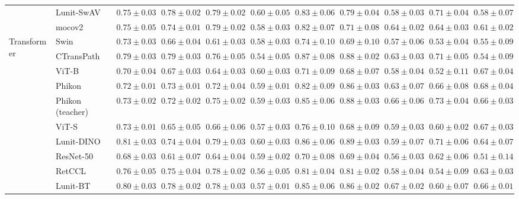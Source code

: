 \begin{tabular}{ll|cccc|c|cccc}
 & Lunit-SwAV & $0.75 \pm 0.03$ & $\mathbf{0.78 \pm 0.02}$ & $\mathbf{0.79 \pm 0.02}$ & $0.60 \pm 0.05$ & $0.83 \pm 0.06$ & $0.79 \pm 0.04$ & $0.58 \pm 0.03$ & $0.71 \pm 0.04$ & $0.58 \pm 0.07$ \\
 & mocov2 & $0.75 \pm 0.05$ & $0.74 \pm 0.01$ & $0.79 \pm 0.02$ & $0.58 \pm 0.03$ & $0.82 \pm 0.07$ & $0.71 \pm 0.08$ & $0.64 \pm 0.02$ & $0.64 \pm 0.03$ & $0.61 \pm 0.02$ \\
\cline{1-11}
\multirow[t]{12}{*}{Transformer} & Swin & $0.73 \pm 0.03$ & $0.66 \pm 0.04$ & $0.61 \pm 0.03$ & $0.58 \pm 0.03$ & $0.74 \pm 0.10$ & $0.69 \pm 0.10$ & $0.57 \pm 0.06$ & $0.53 \pm 0.04$ & $0.55 \pm 0.09$ \\
 & CTransPath & $0.79 \pm 0.03$ & $\mathbf{0.79 \pm 0.03}$ & $0.76 \pm 0.05$ & $0.54 \pm 0.05$ & $\mathbf{0.87 \pm 0.08}$ & $0.88 \pm 0.02$ & $0.63 \pm 0.03$ & $0.71 \pm 0.05$ & $0.54 \pm 0.09$ \\
 & ViT-B & $0.70 \pm 0.04$ & $0.67 \pm 0.03$ & $0.64 \pm 0.03$ & $0.60 \pm 0.03$ & $0.71 \pm 0.09$ & $0.68 \pm 0.07$ & $0.58 \pm 0.04$ & $0.52 \pm 0.11$ & $0.67 \pm 0.04$ \\
 & Phikon & $0.72 \pm 0.01$ & $0.73 \pm 0.01$ & $0.72 \pm 0.04$ & $0.59 \pm 0.01$ & $0.82 \pm 0.09$ & $0.86 \pm 0.03$ & $0.63 \pm 0.07$ & $0.66 \pm 0.08$ & $\mathbf{0.68 \pm 0.04}$ \\
 & Phikon (teacher) & $0.73 \pm 0.02$ & $0.72 \pm 0.02$ & $0.75 \pm 0.02$ & $0.59 \pm 0.03$ & $0.85 \pm 0.06$ & $0.88 \pm 0.03$ & $0.66 \pm 0.06$ & $\mathbf{0.73 \pm 0.04}$ & $0.66 \pm 0.03$ \\
 & ViT-S & $0.73 \pm 0.01$ & $0.65 \pm 0.05$ & $0.66 \pm 0.06$ & $0.57 \pm 0.03$ & $0.76 \pm 0.10$ & $0.68 \pm 0.09$ & $0.59 \pm 0.03$ & $0.60 \pm 0.02$ & $0.67 \pm 0.03$ \\
 & Lunit-DINO & $\mathbf{0.81 \pm 0.03}$ & $0.74 \pm 0.04$ & $\mathbf{0.79 \pm 0.03}$ & $\mathbf{0.60 \pm 0.03}$ & $0.86 \pm 0.06$ & $\mathbf{0.89 \pm 0.03}$ & $0.59 \pm 0.07$ & $0.71 \pm 0.06$ & $0.64 \pm 0.07$ \\
 & ResNet-50 & $0.68 \pm 0.03$ & $0.61 \pm 0.07$ & $0.64 \pm 0.04$ & $0.59 \pm 0.02$ & $0.70 \pm 0.08$ & $0.69 \pm 0.04$ & $0.56 \pm 0.03$ & $0.62 \pm 0.06$ & $0.51 \pm 0.14$ \\
 & RetCCL & $0.76 \pm 0.05$ & $0.75 \pm 0.04$ & $0.78 \pm 0.02$ & $0.56 \pm 0.05$ & $0.81 \pm 0.04$ & $0.81 \pm 0.02$ & $0.58 \pm 0.04$ & $0.54 \pm 0.09$ & $0.63 \pm 0.03$ \\
 & Lunit-BT & $0.80 \pm 0.03$ & $0.78 \pm 0.02$ & $0.78 \pm 0.03$ & $0.57 \pm 0.01$ & $0.85 \pm 0.06$ & $0.86 \pm 0.02$ & $\mathbf{0.67 \pm 0.02}$ & $0.60 \pm 0.07$ & $0.66 \pm 0.01$ \\

\end{tabular}
